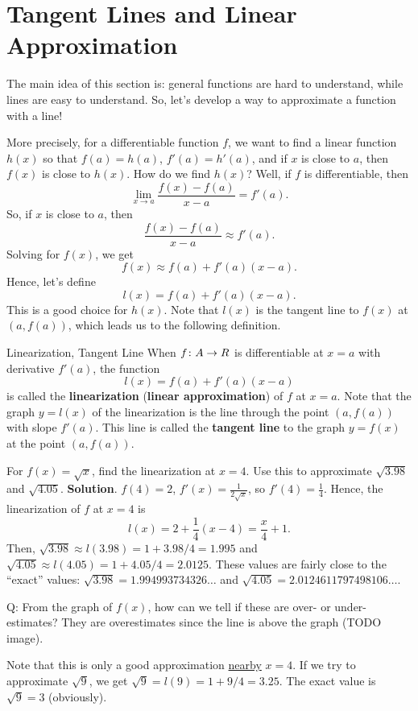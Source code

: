 \setcounter{section}{4}
\section{Tangent Lines and Linear Approximation} %
The main idea of this section is: general functions are hard to understand, while
lines are easy to understand. So, let's develop a way to approximate a function
with a line!

More precisely, for a differentiable function $ f $, we want to find a linear function
$ h(x) $ so that $ f(a)=h(a) $, $ f'(a)=h'(a) $, and if $ x $ is close to $ a $,
then $ f(x) $ is close to $ h(x) $. How do we find $ h(x) $? Well,
if $ f $ is differentiable, then
\[ \lim\limits_{{x} \to {a}}\frac{f(x)-f(a)}{x-a}=f'(a). \]
So, if $ x $ is close to $ a $, then
\[ \frac{f(x)-f(a)}{x-a}\approx f'(a). \]
Solving for $ f(x) $, we get
\[ f(x)\approx f(a)+f'(a)(x-a). \]
Hence, let's define
\[ l(x)=f(a)+f'(a)(x-a). \]
This is a good choice for $ h(x) $. Note that $ l(x) $ is the tangent
line to $ f(x) $ at $ (a,f(a)) $, which leads us to the following definition.
\begin{Definition}{Linearization, Tangent Line}{}
    When $ f\colon A\to \relax{R} $ is differentiable at $ x=a $ with derivative $ f'(a) $, the function
    \[ l(x)=f(a)+f'(a)(x-a) \]
    is called the \textbf{linearization} (\textbf{linear approximation}) of $ f $ at $ x=a $. Note that the graph $ y=l(x) $
    of the linearization is the line through the point $ (a,f(a)) $ with slope $ f'(a) $.
    This line is called the \textbf{tangent line} to the graph $ y=f(x) $ at the point $ (a,f(a)) $.
\end{Definition}
\begin{Example}{}{}
    For $ f(x)=\sqrt{x} $, find the linearization at $ x=4 $. Use this to approximate $ \sqrt{3.98} $ and $ \sqrt{4.05} $.
    \tcblower{}
    \textbf{Solution}.
    $ f(4)=2 $, $ f'(x)=\frac{1}{2\sqrt{x}} $, so $ f'(4)=\frac{1}{4} $. Hence, the linearization of $ f $ at $ x=4 $ is
    \[ l(x)=2+\frac{1}{4}(x-4)=\frac{x}{4}+1. \]
    Then, $ \sqrt{3.98}\approx l(3.98)=1+3.98/4=1.995 $ and $ \sqrt{4.05}\approx l(4.05)=1+4.05/4=2.0125 $.
    These values are fairly close to the ``exact'' values: $ \sqrt{3.98}= 1.994993734326\ldots $ and
    $ \sqrt{4.05}= 2.0124611797498106\ldots $.
\end{Example}
Q\@: From the graph of $ f(x) $, how can we tell if these are over- or under-estimates? They are overestimates since the line is above the graph (TODO image).
\begin{Remark}{}{}
    Note that this is only a good approximation \underline{nearby} $ x=4 $. If we try to approximate $ \sqrt{9} $,
    we get $ \sqrt{9}=l(9)=1+9/4=3.25 $. The exact value is $ \sqrt{9}=3 $ (obviously).
\end{Remark}
